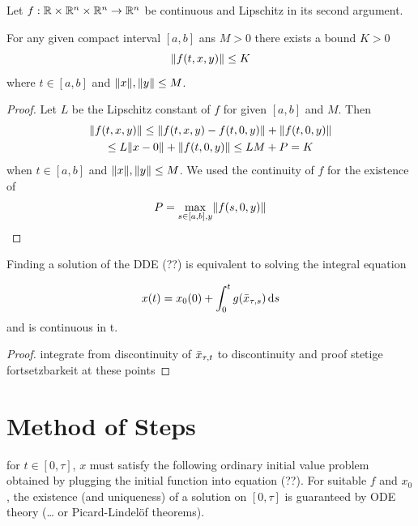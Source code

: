 \begin{lemma}
    \label{lemma-bounded-f}

    Let $f:\deff\rightarrow\R^n$ be continuous and Lipschitz in its second argument.

    For any given compact interval $[a,b]$ ans $M>0$ there exists a bound $K>0$
    \begin{equation}
        \nnorm{f(t,x,y)}\leq K
    \end{equation}
    where $t\in[a,b]$ and $\nnorm{x},\nnorm{y}\leq M$.
\end{lemma}

\begin{proof}
    Let $L$ be the Lipschitz constant of $f$ for given $[a,b]$ and $M$. Then
    \begin{multline}
        \nnorm{f(t,x,y)} \leq \nnorm{f(t,x,y) - f(t,0,y)} + \nnorm{f(t,0,y)}\\
        \leq L\nnorm{x-0} + \nnorm{f(t,0,y)} \leq LM+P = K
    \end{multline}
    when $t\in[a,b]$ and $\nnorm{x},\nnorm{y}\leq M$. We used the continuity of $f$ for the existence of
    \begin{equation}
        P = \max_{s\in [a,b],y}\nnorm{f(s,0,y)}
    \end{equation}
\end{proof}

\begin{lemma}
    \label{lemma-integral-equation}


    Finding a solution of the DDE (??) is equivalent to solving the integral equation

    \begin{equation}
        x(t) = x_0(0) + \int_0^t g(\bar{x}_{\tau,s})\dx[s]
    \end{equation}
    and is continuous in t.
\end{lemma}

\begin{proof}
integrate from discontinuity of $\xbartaut{t}$ to discontinuity and proof stetige fortsetzbarkeit at these points
\end{proof}

\section{Method of Steps} \label{sec:method-of-steps}
for $t\in [0,\tau]$, $x$ must satisfy the following ordinary initial value problem obtained by plugging the initial function into equation (??). For suitable $f$ and $x_0$, the existence (and uniqueness) of a solution on $[0,\tau]$ is guaranteed by ODE theory (\ldots{} or Picard-Lindelöf theorems).

